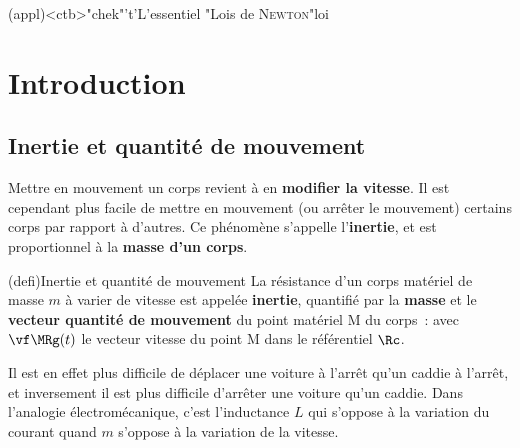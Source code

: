 \documentclass[../../main/main.tex]{subfiles}
\begin{document}
\vspace*{\fill}
\newpage
\vspace*{\fill}

\begin{tcn}[%
		sidebyside, fontupper=\small, fontlower=\small
	](appl)<ctb>"chek"'t'{L'essentiel}
	\tcblower
	\tce"Lois de \textsc{Newton}"{loi}
\end{tcn}

\vspace*{\fill}

\newpage

\section{Introduction}

\subsection{Inertie et quantité de mouvement}
Mettre en mouvement un corps revient à en \textbf{modifier la vitesse}. Il est
cependant plus facile de mettre en mouvement (ou arrêter le mouvement) certains
corps par rapport à d'autres. Ce phénomène s'appelle l'\textbf{inertie}, et est
proportionnel à la \textbf{masse d'un corps}.

\begin{tcb*}(defi){Inertie et quantité de mouvement}
	La résistance d'un corps matériel de masse $m$ à varier de vitesse est
	appelée \textbf{inertie}, quantifié par la \textbf{masse} et le
	\textbf{vecteur quantité de mouvement} du point matériel M du corps~:
	\psw{%
		\[
			\boxed{\pf\MRg(t) = m\vf\MRg(t)}
		\]
	}
	avec $\vf\MRg(t)$ le vecteur vitesse du point M dans le référentiel $\Rc$.
\end{tcb*}

Il est en effet plus difficile de déplacer une voiture à l'arrêt qu'un caddie à
l'arrêt, et inversement il est plus difficile d'arrêter une voiture qu'un
caddie. Dans l'analogie électromécanique, c'est l'inductance $L$ qui s'oppose à
la variation du courant quand $m$ s'oppose à la variation de la vitesse.
\end{document}
